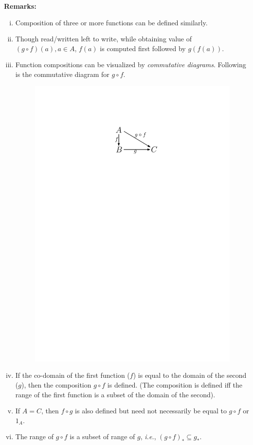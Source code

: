 \documentclass[a4paper,english,12pt]{article}
\begin{document}
\textbf{Remarks:}
\begin{enumerate}[i)]
\item Composition of three or more functions can be defined similarly.
\item Though read/written left to write, while obtaining value of $(g\circ f)(a),a\in A$, $f(a)$ is computed first followed by $g(f(a))$.
\item Function compositions can be visualized by \textit{commutative diagrams}. Following is the commutative diagram for $g\circ f$.
\begin{figure}[h]
\centering
\includegraphics[scale=0.8]{Figures/l5f3_commdiag.pdf}
\end{figure}
\item If the co-domain of the first function ($f$) is equal to the domain of the second ($g$), then the composition $g\circ f$ is defined. (The composition is defined iff the range of the first function is a subset of the domain of the second).
\item If $A=C$, then $f\circ g$ is also defined but need not necessarily be equal to $g\circ f$ or $1_A$.
\item The range of $g\circ f$ is a subset of range of $g$, \textit{i.e.}, $(g\circ f)_*\subseteq g_*$.
\end{enumerate}
\end{document}
